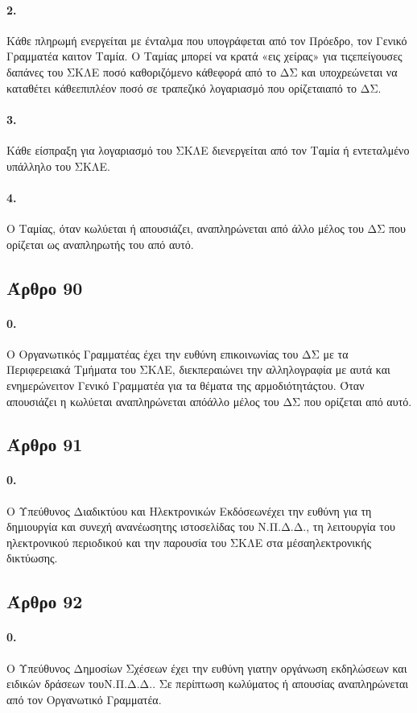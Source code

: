 \documentclass[a4paper,oneside, 10pt]{book}
\begin{document}
\paragraph { 2. } Κάθε πληρωμή ενεργείται με ένταλμα που υπογράφεται από τον Πρόεδρο, τον Γενικό Γραμματέα καιτον Ταμία. Ο Ταμίας μπορεί να κρατά «εις χείρας» για τιςεπείγουσες δαπάνες του ΣΚΛΕ ποσό καθοριζόμενο κάθεφορά από το ΔΣ και υποχρεώνεται να καταθέτει κάθεεπιπλέον ποσό σε τραπεζικό λογαριασμό που ορίζεταιαπό το ΔΣ.
\paragraph { 3. } Κάθε είσπραξη για λογαριασμό του ΣΚΛΕ διενεργείται από τον Ταμία ή εντεταλμένο υπάλληλο του ΣΚΛΕ.
\paragraph { 4. } Ο Ταμίας, όταν κωλύεται ή απουσιάζει, αναπληρώνεται από άλλο μέλος του ΔΣ που ορίζεται ως αναπληρωτής του από αυτό.
\subsection*{ Άρθρο 90 }
\paragraph { 0. } Ο Οργανωτικός Γραμματέας έχει την ευθύνη επικοινωνίας του ΔΣ με τα Περιφερειακά Τμήματα του ΣΚΛΕ, διεκπεραιώνει την αλληλογραφία με αυτά και ενημερώνειτον Γενικό Γραμματέα για τα θέματα της αρμοδιότητάςτου. Όταν απουσιάζει η κωλύεται αναπληρώνεται απόάλλο μέλος του ΔΣ που ορίζεται από αυτό.
\subsection*{ Άρθρο 91 }
\paragraph { 0. } Ο Υπεύθυνος Διαδικτύου και Ηλεκτρονικών Εκδόσεωνέχει την ευθύνη για τη δημιουργία και συνεχή ανανέωσητης ιστοσελίδας του Ν.Π.Δ.Δ., τη λειτουργία του ηλεκτρονικού περιοδικού και την παρουσία του ΣΚΛΕ στα μέσαηλεκτρονικής δικτύωσης.
\subsection*{ Άρθρο 92 }
\paragraph { 0. } Ο Υπεύθυνος Δημοσίων Σχέσεων έχει την ευθύνη γιατην οργάνωση εκδηλώσεων και ειδικών δράσεων τουΝ.Π.Δ.Δ.. Σε περίπτωση κωλύματος ή απουσίας αναπληρώνεται από τον Οργανωτικό Γραμματέα.
\end{document}
